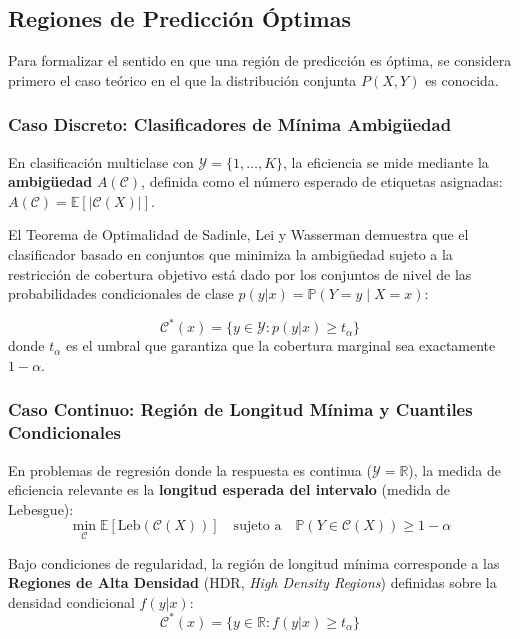 \subsection{Regiones de Predicción Óptimas}

Para formalizar el sentido en que una región de predicción es óptima, se considera primero el caso teórico en el que la distribución conjunta $P(X,Y)$ es conocida.

\subsubsection{Caso Discreto: Clasificadores de Mínima Ambigüedad}

En clasificación multiclase con $\mathcal{Y} = \{1, \dots, K\}$, la eficiencia se mide mediante la \textbf{ambigüedad} $A(\mathcal{C})$, definida como el número esperado de etiquetas asignadas: $A(\mathcal{C}) = \mathbb{E}[|\mathcal{C}(X)|]$.

El Teorema de Optimalidad de Sadinle, Lei y Wasserman \cite{sadinle2018} demuestra que el clasificador basado en conjuntos que minimiza la ambigüedad sujeto a la restricción de cobertura objetivo está dado por los conjuntos de nivel de las probabilidades condicionales de clase $p(y|x) = \mathbb{P}(Y=y \mid X=x)$:

\begin{equation}
    \mathcal{C}^*(x) = \{y \in \mathcal{Y} : p(y|x) \ge t_\alpha\}
\end{equation}
donde $t_\alpha$ es el umbral que garantiza que la cobertura marginal sea exactamente $1 - \alpha$.




\subsubsection{Caso Continuo: Región de Longitud Mínima y Cuantiles Condicionales}
En problemas de regresión donde la respuesta es continua ($\mathcal{Y} = \mathbb{R}$), la medida de eficiencia relevante es la \textbf{longitud esperada del intervalo} (medida de Lebesgue):
\begin{equation}
    \min_{\mathcal{C}} \mathbb{E}[\text{Leb}(\mathcal{C}(X))] \quad \text{sujeto a} \quad \mathbb{P}(Y \in \mathcal{C}(X)) \ge 1 - \alpha
\end{equation}

Bajo condiciones de regularidad, la región de longitud mínima corresponde a las \textbf{Regiones de Alta Densidad} (HDR, \textit{High Density Regions}) definidas sobre la densidad condicional $f(y|x)$:
\begin{equation}
    \mathcal{C}^*(x) = \{y \in \mathbb{R} : f(y|x) \ge t_\alpha\}
\end{equation}

